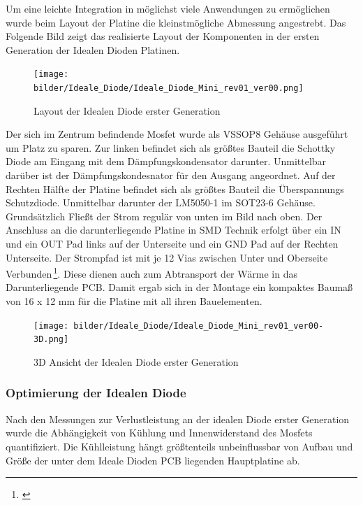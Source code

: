 Um eine leichte Integration in möglichst viele Anwendungen zu ermöglichen wurde beim Layout der Platine die kleinstmögliche Abmessung angestrebt. 
Das Folgende Bild zeigt das realisierte Layout der Komponenten in der ersten Generation der Idealen Dioden Platinen.

\begin{figure}[H]
\centering
\texttt{[image: bilder/Ideale\_Diode/Ideale\_Diode\_Mini\_rev01\_ver00.png]} 
\caption{Layout der Idealen Diode erster Generation} 
\label{fig:Layout der Idealen Diode erster Generation}
\end{figure}

Der sich im Zentrum befindende Mosfet wurde als VSSOP8 Gehäuse ausgeführt um Platz zu sparen. Zur linken befindet sich als größtes Bauteil die Schottky Diode am Eingang mit dem Dämpfungskondensator darunter. Unmittelbar darüber ist der Dämpfungskondesnator für den Ausgang angeordnet. Auf der Rechten Hälfte der Platine befindet sich als größtes Bauteil die Überspannungs Schutzdiode. Unmittelbar darunter der LM5050-1 im SOT23-6 Gehäuse.
Grundsätzlich Fließt der Strom regulär von unten im Bild nach oben.
Der Anschluss an die darunterliegende Platine in SMD Technik erfolgt über ein IN und ein OUT Pad links auf der Unterseite und ein GND Pad auf der Rechten Unterseite.
Der Strompfad ist mit je 12 Vias zwischen Unter und Oberseite Verbunden\,\footnote{\cite[vgl.][Seite~24f.]{PCBStandard}}. Diese dienen auch zum Abtransport der Wärme in das Darunterliegende PCB.
Damit ergab sich in der Montage ein kompaktes Baumaß von 16 x 12 mm für die Platine mit all ihren Bauelementen.

\begin{figure}[H]
\centering
\texttt{[image: bilder/Ideale\_Diode/Ideale\_Diode\_Mini\_rev01\_ver00-3D.png]} 
\caption{3D Ansicht der Idealen Diode erster Generation} 
\label{fig:3D Ansicht der Idealen Diode erster Generation}
\end{figure}

\subsubsection{Optimierung der Idealen Diode}

Nach den Messungen zur Verlustleistung an der idealen Diode erster Generation wurde die Abhängigkeit von Kühlung und Innenwiderstand des Mosfets quantifiziert. 
Die Kühlleistung hängt größtenteils unbeinflussbar \cite{IEEE_Thermal_conductivity} von Aufbau und Größe der unter dem Ideale Dioden PCB liegenden Hauptplatine ab.

